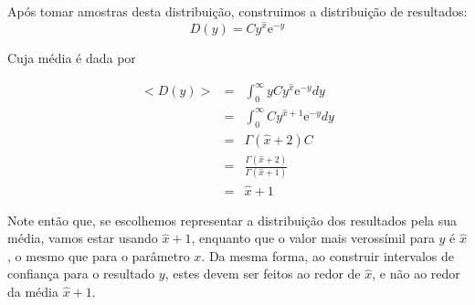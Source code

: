 Ap\'os tomar amostras desta distribui\c c\~ao, construimos a distribui\c c\~ao
de resultados:
\begin{equation}
	D(y) = C y^{\hat x} \mathrm{e}^{-y}
\end{equation}

Cuja m\'edia \'e dada por

\begin{eqnarray*}
	<D(y)> & = & \int_0^\infty y C y^{\hat x} \mathrm{e}^{-y} dy \\
	       & = & \int_0^\infty C y^{\hat x+1} \mathrm{e}^{-y} dy \\
		   & = & \Gamma(\hat x +2) C\\
	       & = & \frac{\Gamma(\hat x +2)}{\Gamma(\hat x + 1)} \\
		   & = & \hat x + 1
\end{eqnarray*}

Note ent\~ao que, se escolhemos representar a distribui\c c\~ao dos resultados pela sua m\'edia,
vamos estar usando $\hat x + 1$, enquanto que o valor mais verossímil para $y$ \'e $\hat x$, o mesmo
que para o par\^ametro $x$. Da mesma forma, ao construir intervalos de confian\c ca para o resultado
$y$, estes devem ser feitos ao redor de $\hat x$, e n\~ao ao redor da m\'edia $\hat x + 1$. 
